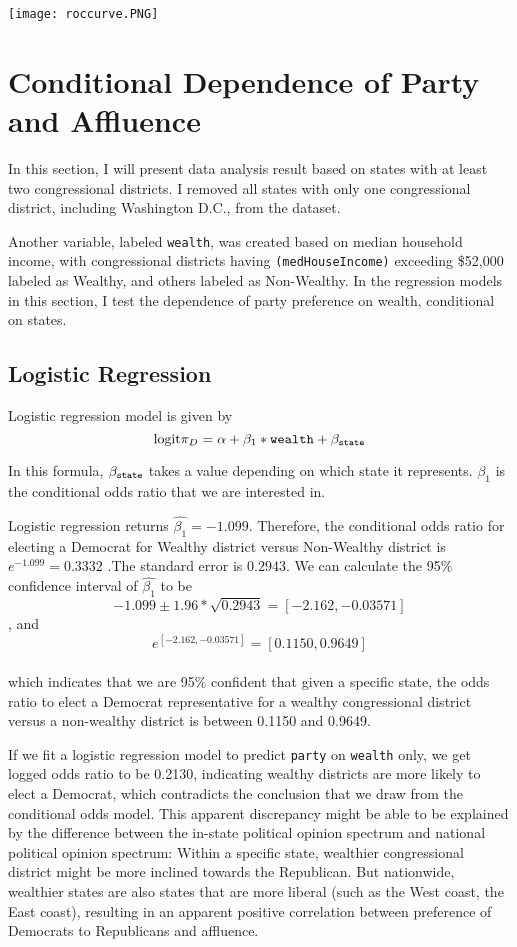 \documentclass[12pt,a4paper]{article}
\begin{document}
\texttt{[image: roccurve.PNG]}

\section{Conditional Dependence of Party and Affluence}

In this section, I will present data analysis result based on states with at least two congressional districts. I removed all states with only one congressional district, including Washington D.C., from the dataset. 

Another variable, labeled \texttt{wealth}, was created based on median household income, with congressional districts having \texttt{(medHouseIncome)} exceeding \$52,000 labeled as Wealthy, and others labeled as Non-Wealthy. In the regression models in this section, I test the dependence of party preference on wealth, conditional on states. 

\subsection{Logistic Regression}

Logistic regression model is given by $$\text{logit}{\pi_D} = \alpha + \beta_1 * \text{\texttt{wealth}} + \beta_{\text{\texttt{state}}}$$

In this formula, $\beta_{\text{\texttt{state}}}$ takes a value depending on which state it represents. $\beta_1$ is the conditional odds ratio that we are interested in.

Logistic regression returns $\hat{\beta_1} = -1.099$. Therefore, the conditional odds ratio for electing a Democrat for Wealthy district versus Non-Wealthy district is $e^{-1.099} = 0.3332$ .The standard error is $0.2943$. We can calculate the 95\% confidence interval of $\hat{\beta_1}$ to be $$-1.099 \pm 1.96 * \sqrt{0.2943} = [-2.162, -0.03571]$$, and $$e^{[-2.162, -0.03571]} =[0.1150, 0.9649] $$
\\which indicates that we are 95\% confident that given a specific state, the odds ratio to elect a Democrat representative for a wealthy congressional district versus a non-wealthy district is between 0.1150 and 0.9649.

If we fit a logistic regression model to predict \texttt{party} on \texttt{wealth} only, we get logged odds ratio to be 0.2130, indicating wealthy districts are more likely to elect a Democrat, which contradicts the conclusion that we draw from the conditional odds model. This apparent discrepancy might be able to be explained by the difference between the in-state political opinion spectrum and national political opinion spectrum: Within a specific state, wealthier congressional district might be more inclined towards the Republican. But nationwide, wealthier states are also states that are more liberal (such as the West coast, the East coast), resulting in an apparent positive correlation between preference of Democrats to Republicans and affluence.
\end{document}
